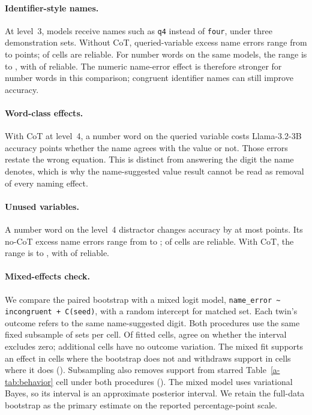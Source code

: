 \paragraph{Identifier-style names.} At level~3,  models receive names such as
\texttt{q4} instead of \texttt{four}, under three demonstration sets. Without CoT, queried-variable
excess name errors range from  to  points;
 of  cells are reliable. For number words
on the same models, the range is  to , with
 of  reliable. The numeric name-error effect is
therefore stronger for number words in this comparison; congruent identifier names can still
improve accuracy.

\paragraph{Word-class effects.} With CoT at level~4, a number word on the queried variable costs
Llama-3.2-3B  accuracy points whether the name agrees with the value or
not. Those errors restate the wrong equation. This is distinct from answering the digit the
name denotes, which is why the name-suggested value result cannot be read as removal of every naming effect.

\paragraph{Unused variables.} A number word on the level~4 distractor changes accuracy by at
most  points. Its no-CoT excess name errors range from  to
;  of  cells are reliable.
With CoT, the range is  to , with
 of  reliable.

\paragraph{Mixed-effects check.} We compare the paired bootstrap with a mixed logit model,
\texttt{name\_error \textasciitilde{} incongruent + C(seed)}, with a random intercept for
matched set. Each twin's outcome refers to the same name-suggested digit. Both procedures use the same
fixed subsample of  sets per cell. Of  fitted cells,
 agree on whether the interval excludes zero;  additional
cells have no outcome variation. The mixed fit supports an effect in  cells
where the bootstrap does not and withdraws support in  cells where it does
(). Subsampling also removes support from  starred
Table~\ref{a-tab:behavior} cell under both procedures (). The mixed
model uses variational Bayes, so its interval is an approximate posterior interval. We retain
the full-data bootstrap as the primary estimate on the reported percentage-point scale.

